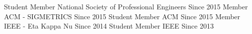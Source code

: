 \begin{cvhonors}
  \cvhonor
    {Student Member}
    {National Society of Professional Engineers}
    {}
    {Since 2015}
  \cvhonor
    {Member}
    {ACM - SIGMETRICS}
    {}
    {Since 2015}
  \cvhonor
    {Student Member}
    {ACM}
    {}
    {Since 2015}
  \cvhonor
    {Member}
    {IEEE - Eta Kappa Nu}
    {}
    {Since 2014}
  \cvhonor
    {Student Member}
    {IEEE}
    {}
    {Since 2013}
\end{cvhonors} 